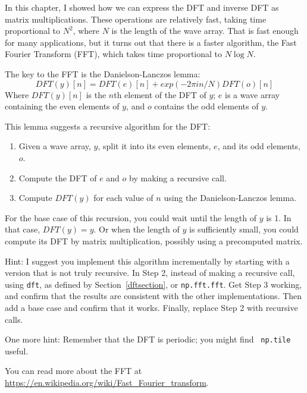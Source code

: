 \documentclass[12pt]{book}
\begin{document}
\begin{exercise}
In this chapter, I showed how we can express the DFT and inverse
DFT as matrix multiplications.  These operations are relatively
fast, taking time proportional to $N^2$, where $N$ is the length
of the wave array.  That is fast enough for many applications,
but it turns out that there is a faster algorithm, the
Fast Fourier Transform (FFT), which takes time proportional to 
$N \log N$.

The key to the FFT is the Danielson-Lanczos lemma:
%
\[ DFT(y)[n] = DFT(e)[n] + exp(-2 \pi i n / N) DFT(o)[n] \]
%
Where $ DFT(y)[n]$ is the $n$th element of the DFT of $y$; $e$ is a
wave array containing the even elements of $y$, and $o$ contains the
odd elements of $y$.

This lemma suggests a recursive algorithm for the DFT:

\begin{enumerate}

\item Given a wave array, $y$, split it into its even elements, $e$,
  and its odd elements, $o$.

\item Compute the DFT of $e$ and $o$ by making a recursive call.

\item Compute $DFT(y)$ for each value of $n$ using the
  Danielson-Lanczos lemma.

\end{enumerate}

For the base case of this recursion, you could wait until the length
of $y$ is 1.  In that case, $DFT(y) = y$.  Or when the length of $y$
is sufficiently small, you could compute its DFT by matrix multiplication,
possibly using a precomputed matrix.

Hint: I suggest you implement this algorithm incrementally by starting
with a version that is not truly recursive.  In Step 2, instead of
making a recursive call, using {\tt dft}, as defined by
Section~\ref{dftsection}, or {\tt np.fft.fft}.  Get Step 3 working,
and confirm that the results are consistent with the other
implementations.  Then add a base case and confirm that it works.
Finally, replace Step 2 with recursive calls.

One more hint: Remember that the DFT is periodic; you might find {\tt
  np.tile} useful.

You can read more about the FFT at
\url{https://en.wikipedia.org/wiki/Fast_Fourier_transform}.

\end{exercise}
\end{document}
